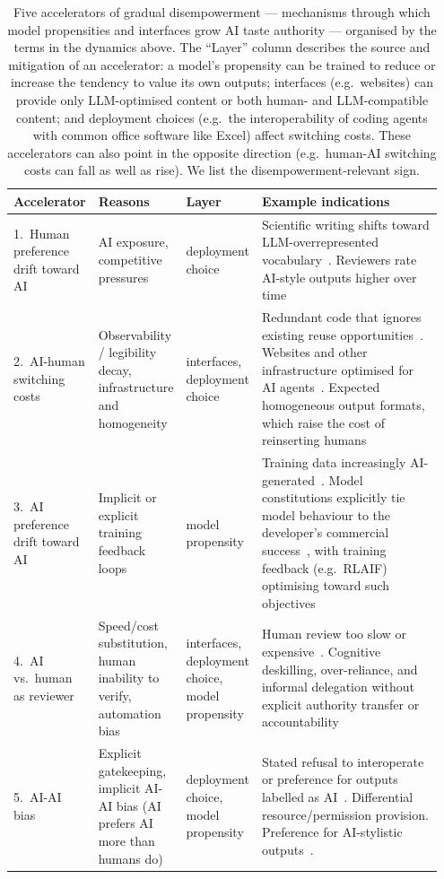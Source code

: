 \documentclass{article}
\begin{document}
\begin{table}[t]
\centering\footnotesize
\caption{Five accelerators of gradual disempowerment --- mechanisms through which model propensities and interfaces grow AI taste authority --- organised by the terms in the dynamics above. The ``Layer'' column describes the source and mitigation of an accelerator: a model's propensity can be trained to reduce or increase the tendency to value its own outputs; interfaces (e.g.\ websites) can provide only LLM-optimised content or both human- and LLM-compatible content; and deployment choices (e.g.\ the interoperability of coding agents with common office software like Excel) affect switching costs. These accelerators can also point in the opposite direction (e.g.\ human-AI switching costs can fall as well as rise). We list the disempowerment-relevant sign.}
\label{tab:taxonomy}
\begin{tabular}{@{}p{0.112\linewidth}p{0.154\linewidth}p{0.105\linewidth}p{0.576\linewidth}@{}}
\toprule
Accelerator & Reasons & Layer & Example indications \\
\midrule
1.\ Human preference drift toward AI & AI exposure, competitive pressures & deployment choice & Scientific writing shifts toward LLM-overrepresented vocabulary~\citep{juzek2025delve}. Reviewers rate AI-style outputs higher over time \\
\midrule
2.\ AI-human switching costs & Observability / legibility decay, infrastructure and homogeneity & interfaces, deployment choice & Redundant code that ignores existing reuse opportunities~\citep{huang2026morecode}. Websites and other infrastructure optimised for AI agents~\citep{stein2026mcp}. Expected homogeneous output formats, which raise the cost of reinserting humans \\
\midrule
3.\ AI preference drift toward AI & Implicit or explicit training feedback loops & model propensity & Training data increasingly AI-generated~\citep{shumailov2024collapse}. Model constitutions explicitly tie model behaviour to the developer's commercial success~\citep{anthropic2026constitution}, with training feedback (e.g.\ RLAIF) optimising toward such objectives~\citep{bai2022constitutional} \\
\midrule
4.\ AI vs.\ human as reviewer & Speed/cost substitution, human inability to verify, automation bias & interfaces, deployment choice, model propensity & Human review too slow or expensive~\citep{thakkar2025iclr,bowman2022oversight, goddard2012automation}. Cognitive deskilling, over-reliance, and informal delegation without explicit authority transfer or accountability~\citep{ibrahim2025overreliance,tomasev2026delegation} \\
\midrule
5.\ AI-AI bias & Explicit gatekeeping, implicit AI-AI bias (AI prefers AI more than humans do) & deployment choice, model propensity & Stated refusal to interoperate or preference for outputs labelled as AI~\citep{laurito2025aibias}. Differential resource/permission provision. Preference for AI-stylistic outputs~\citep{panickssery2024evaluators}. \\
\bottomrule
\end{tabular}
\end{table}
\end{document}
